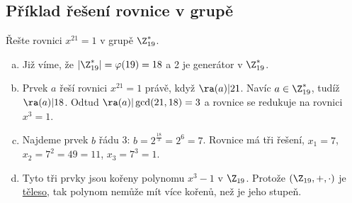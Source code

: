 \subsection{Příklad řešení rovnice v grupě}
Řešte rovnici $x^{21} = 1$ v grupě $\Z_{19}^*$.
\begin{enumerate}[a)]
	\item Již víme, že $|\Z_{19}^*| = \varphi(19) =18$ a 2 je generátor v $\Z_{19}^*$.
	\item Prvek $a$ řeší rovnici $x^{21} = 1$ právě, když $\ra(a)|21$. Navíc $a \in \Z_{19}^*$, tudíž $\ra(a) | 18$. Odtud $\ra(a) | \gcd(21, 18) = 3$ a rovnice se redukuje na rovnici $x^3 =1$.
	\item Najdeme prvek $b$ řádu 3: $b=2^{\frac{18}{3}} = 2^6 = 7$. Rovnice má tři řešení, $x_1 = 7$, $x_2 = 7^2 = 49 = 11$, $x_3 = 7^3 = 1$.
	\item Tyto tři prvky jsou kořeny polynomu $x^3 - 1$ v $\Z_{19}$. Protože $(\Z_{19}, +, \cdot)$ je \hyperref[teleso]{těleso}, tak polynom nemůže mít více kořenů, než je jeho stupeň.
\end{enumerate}
